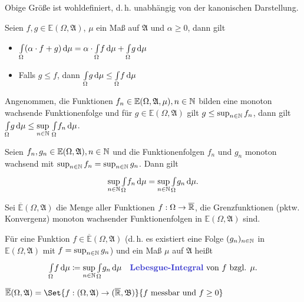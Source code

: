 \documentclass{cheat-sheet}
\newcommand{\ER}{\overline\R} %
\newcommand{\Alg}{\mathfrak{A}} %
\newcommand{\Bor}{\mathfrak{B}} %
\newcommand{\E}{\mathbb{E}} %
\newcommand{\IntOmu}[1]{\Int{\Omega}{}{#1}{\mu}} %
\begin{document}
\begin{bem}
  Obige Größe ist wohldefiniert, d.\,h. unabhängig von der kanonischen Darstellung.
\end{bem}

\begin{satz}
  Seien $f, g \in \E(\Omega, \Alg)$, $\mu$ ein Maß auf $\Alg$ und $\alpha \geq 0$, dann gilt
  \begin{itemize}
    \item $\IntOmu{(\alpha \cdot f + g)} = \alpha \cdot \IntOmu{f} + \IntOmu{g}$ 
    \item Falls $g \leq f$, dann $\IntOmu{g} \leq \IntOmu{f}$ 
  \end{itemize}
\end{satz}

\begin{satz}
  Angenommen, die Funktionen $f_n \in \E(\Omega, \Alg, \mu), n \in \N$ bilden eine monoton wachsende Funktionenfolge und für $g \in \E(\Omega, \Alg)$ gilt $g \leq \sup_{n \in \mathbb{N}} f_n$, dann gilt $\textstyle \IntOmu{g} \leq \sup\limits_{n \in \N} \, \IntOmu{f_n}$.
\end{satz}

\begin{kor}
  Seien $f_n, g_n \in \E(\Omega, \Alg), n \in \N$ und die Funktionenfolgen $f_n$ und $g_n$ monoton wachsend mit $\sup_{n \in \mathbb{N}} f_n = \sup_{n \in \mathbb{N}} g_n$. Dann gilt
  \[ \sup_{n \in \N} \IntOmu{f_n} = \sup_{n \in \N} \IntOmu{g_n}. \]
\end{kor}

\begin{defn}
  Sei $\overline{\E}(\Omega, \Alg)$ die Menge aller Funktionen $f : \Omega \to \ER$, die Grenzfunktionen (pktw. Konvergenz) monoton wachsender Funktionenfolgen in $\E(\Omega, \Alg)$ sind.
\end{defn}

\begin{defn}
  Für eine Funktion $f \in \overline{\E}(\Omega, \Alg)$ (d.\,h. es existiert eine Folge $(g_n)_{n \in \mathbb{N}}$ in $\E(\Omega, \Alg)$ mit $f = \sup_{n \in \mathbb{N}} g_n$) und ein Maß $\mu$ auf $\Alg$ heißt
  \[ \IntOmu{f} \coloneqq \sup_{n \in \N} \IntOmu{g_n} \quad \text{\emph{Lebesgue-Integral} von $f$ bzgl. $\mu$.} \]
\end{defn}

\begin{satz}
  $\overline{\E}(\Omega, \Alg) = \Set{ f : (\Omega, \Alg) \to (\ER, \Bor) }{ f \text{ messbar und } f \geq 0 }$
\end{satz}
\end{document}
